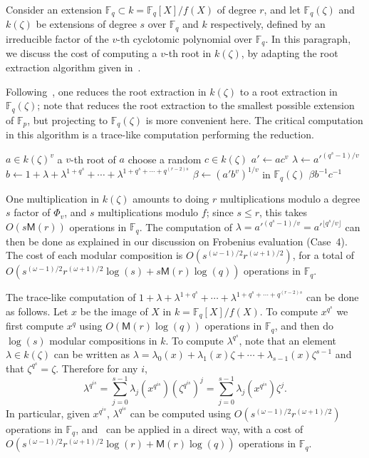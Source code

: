 \documentclass{mcom-l}
\theoremstyle{plain}
\theoremstyle{definition}
\newcommand{\F}{\ensuremath{\mathbb{F}}}
\newcommand{\MM}{\ensuremath{\mathsf{M}}}
\newcounter{algorithm}
\begin{document}
Consider an extension $\F_q \subset k=\F_q[X]/f(X)$ of degree $r$, and
let $\F_q(\zeta)$ and $k(\zeta)$ be extensions of degree $s$ over
$\F_q$ and $k$ respectively, defined by an irreducible factor of the
$v$-th cyclotomic polynomial over $\F_q$. In this paragraph, we
discuss the cost of computing a $v$-th root in $k(\zeta)$, by adapting
the root extraction algorithm given in~\cite{doliskanischost2011}.

Following~\cite[Algorithm~3]{doliskanischost2011}, one reduces the
root extraction in $k(\zeta)$ to a root extraction in $\F_q(\zeta)$;
note that \cite[Algorithm~3]{doliskanischost2011} reduces the root
extraction to the smallest possible extension of $\F_p$, but
projecting to $\F_q(\zeta)$ is more convenient here. The critical
computation in this algorithm is a trace-like computation performing
the reduction.

\begin{algorithm}
\label{algorithm:new}
\begin{algorithmic}[1]
\REQUIRE $a \in k(\zeta)^v$
\ENSURE a $v$-th root of $a$
\REPEAT
\STATE choose a random $c \in k(\zeta)$
\STATE $a'\leftarrow ac^v$
\STATE $\lambda \leftarrow {a'}^{(q^s-1)/v}$
\STATE $b \leftarrow 1 + \lambda + \lambda^{1+q^{s}} + \cdots + \lambda^{1+q^{s}+\cdots+q^{(r-2)s}}$
\STATE $\beta \leftarrow (a'b^v)^{1/v}$ in $\F_q(\zeta)$
\RETURN $\beta b^{-1}c^{-1}$
\end{algorithmic}
\end{algorithm}

One multiplication in $k(\zeta)$ amounts to doing $r$ multiplications
modulo a degree $s$ factor of $\Phi_v$, and $s$ multiplications modulo
$f$; since $s \le r$, this takes $O(s \MM(r))$ operations in $\F_q$.
The computation of $\lambda = {a'}^{(q^s - 1)/v}= {a'}^{\lfloor
  q^s/v\rfloor}$ can then be done as explained in our discussion on
Frobenius evaluation (Case~4). The cost of each modular composition
 is $O(s^{(\omega-1)/2} r^{(\omega+1)/2})$, for a 
total of $O(s^{(\omega-1)/2} r^{(\omega+1)/2}\log(s) +
s\MM(r)\log(q))$ operations in $\F_q$.


The trace-like computation of $1 + \lambda + \lambda^{1+q^{s}} +
\cdots + \lambda^{1+q^{s}+\cdots+q^{(r-2)s}}$ can be done as follows.
Let $x$ be the image of $X$ in $k=\F_q[X]/f(X)$.  To compute $x^{q^s}$
we first compute $x^q$ using $O(\MM(r)\log(q))$ operations in $\F_q$,
and then do $\log(s)$ modular compositions in $k$.  To compute
$\lambda^{q^s}$, note that an element $\lambda \in k(\zeta)$ can be
written as $\lambda = \lambda_0(x) + \lambda_1(x) \zeta + \cdots +
\lambda_{s - 1}(x) \zeta^{s - 1}$ and that $\zeta^{q^s} = \zeta$.
Therefore for any $i$,
\[
\lambda^{q^{i s}} = \sum_{j = 0}^{s - 1} \lambda_j(x^{q^{i s}}) \left(\zeta^{q^{i s}}\right)^j = \sum_{j = 0}^{s - 1} \lambda_j(x^{q^{i s}}) \zeta^j.
\]
In particular, given $x^{q^{i s}}$, $\lambda^{q^{is}}$ can be computed using $O(s^{(\omega-1)/2}r^{(\omega+1)/2})$ operations in $\F_q$,
and~\cite[Algorithm~2]{doliskanischost2011} can be applied in a direct
way, with a cost of $O(s^{(\omega-1)/2}r^{(\omega+1)/2}\log(r) + \MM(r)\log(q))$ operations in $\F_q$.
\end{document}
